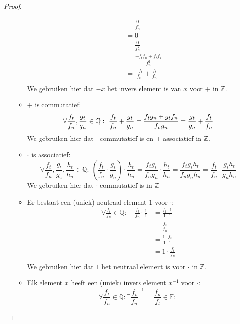 \documentclass[main.tex]{subfiles}
\begin{document}
\begin{pr}
\begin{proof}
\begin{itemize}
\begin{itemize}
\[\begin{array}{rrl}
          &&= \frac{0}{f_{n}^{2}}\\
          &&= 0 \\
          &&= \frac{0}{f_{n}^{2}}\\
          &&= \frac{-f_{t}f_{n} + f_{t}f_{n}}{f_{n}^{2}}\\
          &&= \frac{-f_{t}}{f_{n}} + \frac{f_{t}}{f_{n}}\\
        \end{array}
        \]
        We gebruiken hier dat $-x$ het invers element is van $x$ voor $+$ in $\mathbb{Z}$. 
      \item $+$ is commutatief:
        \[
        \forall \frac{f_{t}}{f_{n}},\frac{g_{t}}{g_{n}} \in \mathbb{Q}:\
        \frac{f_{t}}{f_{n}} + \frac{g_{t}}{g_{n}}
        = \frac{f_{t}g_{n}+g_{t}f_{n}}{f_{n}g_{n}}\\ 
        = \frac{g_{t}}{g_{n}} + \frac{f_{t}}{f_{n}}\\
        \]
        We gebruiken hier dat $\cdot$ commutatief is en $+$ associatief in $\mathbb{Z}$.
      \item $\cdot$ is associatief:
        \[
        \forall \frac{f_{t}}{f_{n}},\frac{g_{t}}{g_{n}},\frac{h_{t}}{h_{n}} \in \mathbb{Q}:\
        \left(\frac{f_{t}}{f_{n}} \cdot \frac{g_{t}}{g_{n}}\right) \cdot \frac{h_{t}}{h_{n}}
        =\frac{f_{t}g_{t}}{f_{n}g_{n}} \cdot \frac{h_{t}}{h_{n}}
        =\frac{f_{t}g_{t}h_{t}}{f_{n}g_{n}h_{n}}
        =\frac{f_{t}}{f_{n}} \cdot \frac{g_{t}h_{t}}{g_{n}h_{n}}
        \]
        We gebruiken hier dat $\cdot$ commutatief is in $\mathbb{Z}$.
      \item Er bestaat een (uniek) neutraal element $1$ voor $\cdot$:
        \[
        \begin{array}{rrl}
          \forall \frac{f_{t}}{f_{n}}\in \mathbb{Q}:\
          &\frac{f_{t}}{f_{n}} \cdot \frac{1}{1}
          &= \frac{f_{t}\cdot 1}{1 \cdot 1}\\
          &&= \frac{f_{t}}{f_{n}}\\
          &&= \frac{1\cdot f_{t}}{1 \cdot 1}\\
          &&= 1 \cdot \frac{f_{t}}{f_{n}}\\
        \end{array}
        \]
        We gebruiken hier dat $1$ het neutraal element is voor $\cdot$ in $\mathbb{Z}$.
      \item Elk element $x$ heeft een (uniek) invers element $x^{-1}$ voor $\cdot$:
        \[
        \forall \frac{f_{t}}{f_{n}}\in \mathbb{Q}: \exists \frac{f_{t}}{f_{n}}^{-1} = \frac{f_{n}}{f_{t}} \in \mathbb{F}: \
\]
\end{itemize}
\end{itemize}
\end{proof}
\end{pr}
\end{document}
